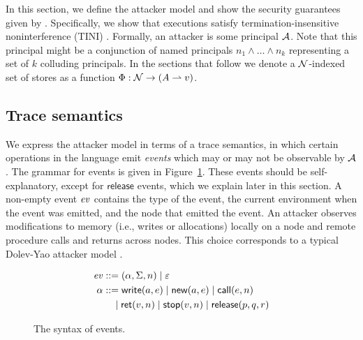 In this section, we define the attacker model and show the security guarantees given by \lang. Specifically, we show that \lang{} executions satisfy termination-insensitive noninterference (TINI) \cite{4223226}. Formally, an attacker is some principal $\mathcal{A}$. Note that this principal might be a conjunction of named principals $n_1 \wedge \dots \wedge n_k$ representing a set of $k$ colluding principals. In the sections that follow we denote a $\mathcal{N}$-indexed set of stores as a function $\Phi: \mathcal{N} \to (A \rightharpoonup v)$.

\subsection{Trace semantics}
We express the attacker model in terms of a trace semantics, in which certain operations in the language emit \emph{events} which may or may not be observable by $\mathcal{A}$. The grammar for events is given in Figure~\ref{fig:event-syntax}. These events should be self-explanatory, except for $\mathsf{release}$ events, which we explain later in this section. A non-empty event $\mathit{ev}$ contains the type of the event, the current environment when the event was emitted, and the node that emitted the event. An attacker observes modifications to memory (i.e., writes or allocations) locally on a node and remote procedure calls and returns across nodes. This choice corresponds to a typical Dolev-Yao attacker model \cite{Dolev:1981:SPK:1382435.1382728}.

\begin{figure}
\centering
\begin{align*}
\mathit{ev} &::= (\alpha, \Sigma, n) \mid \varepsilon\\
\alpha &::= \mathsf{write}(a, e) \mid \mathsf{new}(a, e) \mid \mathsf{call}(e, n) \\ &\quad \mid \mathsf{ret}(v, n) \mid \mathsf{stop}(v, n) \mid \mathsf{release}(p, q, r)
\end{align*}
\caption{The syntax of events.}
\label{fig:event-syntax}
\end{figure}

